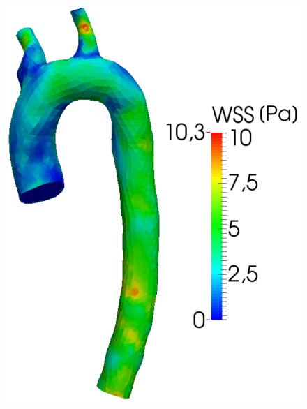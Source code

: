 \documentclass[a4paper, 11pt, twoside]{article}
\begin{document}
\begin{figure}[H]
\centering
\begin{minipage}{0.45\textwidth}
\includegraphics[width=\textwidth]{fig/aorta_wss.png}
\end{minipage}
\hspace{1cm}
\begin{minipage}{0.53\textwidth}

\end{minipage}
\end{figure}
\end{document}
